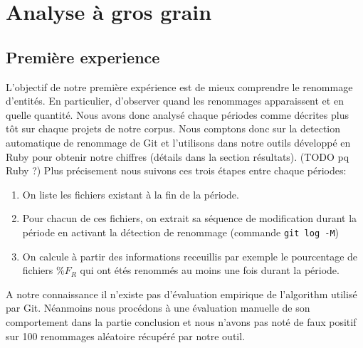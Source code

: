 \section{Analyse à gros grain}
\label{sec:analyse_gros_grain}

\subsection{Première experience}
L'objectif de notre première expérience est de mieux comprendre le renommage d'entités. En particulier, d'observer quand les renommages apparaissent et en quelle quantité. Nous avons donc analysé chaque périodes comme décrites plus tôt sur chaque projets de notre corpus. Nous comptons donc sur la detection automatique de renommage de Git et l'utilisons dans notre outils développé en Ruby pour obtenir notre chiffres (détails dans la section résultats). (TODO pq Ruby ?) Plus précisement nous suivons ces trois étapes entre chaque périodes:\\
\begin{enumerate}
\item On liste les fichiers existant à la fin de la période.
\item Pour chacun de ces fichiers, on extrait sa séquence de modification durant la période en activant la détection de renommage (commande \texttt{git log -M})
\item On calcule à partir des informations receuillis par exemple le pourcentage de fichiers $\%F_{R}$ qui ont étés renommés au moins une fois durant la période.
\end{enumerate}

A notre connaissance il n'existe pas d'évaluation empirique de l'algorithm utilisé par Git. Néanmoins nous procédons à une évaluation manuelle de son comportement dans la partie conclusion et nous n'avons pas noté de faux positif sur 100 renommages aléatoire récupéré par notre outil. \\

